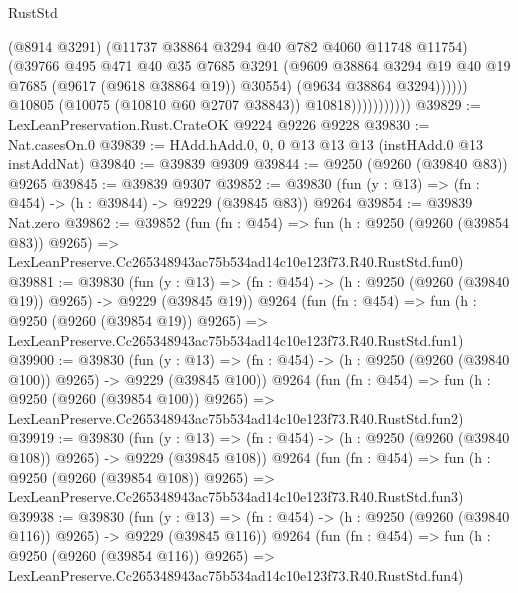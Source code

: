 \begin{lexlean}{RustStd}
\begin{coremodule}
                                  (@8914 @3291)
                                  (@11737 @38864 @3294 @40 @782 @4060 @11748 @11754)
                                  (@39766
                                    @495
                                    @471
                                    @40
                                    @35
                                    @7685
                                    @3291
                                    (@9609
                                      @38864
                                      @3294
                                      @19
                                      @40
                                      @19
                                      @7685
                                      (@9617 (@9618 @38864 @19))
                                      @30554)
                                    (@9634 @38864 @3294))))))
                          @10805
                          (@10075 (@10810 @60 @2707 @38843))
                          @10818)))))))))))
@39829 := LexLeanPreservation.Rust.CrateOK @9224 @9226 @9228
@39830 := Nat.casesOn.{0}
@39839 := HAdd.hAdd.{0, 0, 0} @13 @13 @13 (instHAdd.{0} @13 instAddNat)
@39840 := @39839 @9309
@39844 := @9250 (@9260 (@39840 @83)) @9265
@39845 := @39839 @9307
@39852 := @39830 (fun (y : @13) => (fn : @454) -> (h : @39844) -> @9229 (@39845 @83)) @9264
@39854 := @39839 Nat.zero
@39862 := @39852
    (fun (fn : @454) =>
    fun (h : @9250 (@9260 (@39854 @83)) @9265) =>
    LexLeanPreserve.Cc265348943ac75b534ad14c10e123f73.R40.RustStd.fun0)
@39881 := @39830
    (fun (y : @13) => (fn : @454) -> (h : @9250 (@9260 (@39840 @19)) @9265) -> @9229 (@39845 @19))
    @9264
    (fun (fn : @454) =>
    fun (h : @9250 (@9260 (@39854 @19)) @9265) =>
    LexLeanPreserve.Cc265348943ac75b534ad14c10e123f73.R40.RustStd.fun1)
@39900 := @39830
    (fun (y : @13) => (fn : @454) -> (h : @9250 (@9260 (@39840 @100)) @9265) -> @9229 (@39845 @100))
    @9264
    (fun (fn : @454) =>
    fun (h : @9250 (@9260 (@39854 @100)) @9265) =>
    LexLeanPreserve.Cc265348943ac75b534ad14c10e123f73.R40.RustStd.fun2)
@39919 := @39830
    (fun (y : @13) => (fn : @454) -> (h : @9250 (@9260 (@39840 @108)) @9265) -> @9229 (@39845 @108))
    @9264
    (fun (fn : @454) =>
    fun (h : @9250 (@9260 (@39854 @108)) @9265) =>
    LexLeanPreserve.Cc265348943ac75b534ad14c10e123f73.R40.RustStd.fun3)
@39938 := @39830
    (fun (y : @13) => (fn : @454) -> (h : @9250 (@9260 (@39840 @116)) @9265) -> @9229 (@39845 @116))
    @9264
    (fun (fn : @454) =>
    fun (h : @9250 (@9260 (@39854 @116)) @9265) =>
    LexLeanPreserve.Cc265348943ac75b534ad14c10e123f73.R40.RustStd.fun4)

\end{coremodule}
\end{lexlean}
